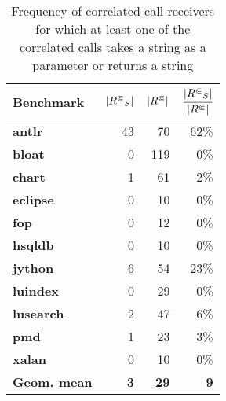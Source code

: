 \begin{table}
\caption{Frequency of correlated-call receivers for which at least one of the correlated calls takes a string as a parameter or returns a string}

\centering
\begin{tabular}{@{}lrrr@{}}
\toprule
\textbf{Benchmark}   & 
  \textbf{$|{R^\Subset}_S|$} & 
  \textbf{$|{R^\Subset}|$} & 
  \textbf{$\cfrac{|{R^\Subset}_S|}{|{R^\Subset}|}$} \\ \midrule
\textbf{antlr}       & 43                     & 70               & 62\%                            \\
\textbf{bloat}       & 0                      & 119              & 0\%                             \\
\textbf{chart}       & 1                      & 61               & 2\%                             \\
\textbf{eclipse}     & 0                      & 10               & 0\%                             \\
\textbf{fop}         & 0                      & 12               & 0\%                             \\
\textbf{hsqldb}      & 0                      & 10               & 0\%                             \\
\textbf{jython}      & 6                      & 54               & 23\%                            \\
\textbf{luindex}     & 0                      & 29               & 0\%                             \\
\textbf{lusearch}    & 2                      & 47               & 6\%                             \\
\textbf{pmd}         & 1                      & 23               & 3\%                             \\
\textbf{xalan}       & 0                      & 10               & 0\%                             \\
\textbf{Geom. mean} & \textbf{3}             & \textbf{29}      & \textbf{9}                    \\ \bottomrule
\end{tabular}
\label{tab:stringstat}
\end{table}

